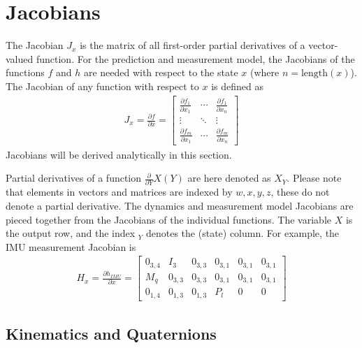 \section{Jacobians}
\label{sec:jacobians}
The Jacobian $J_x$ is the matrix of all first-order partial derivatives of a vector-valued function.
For the prediction and measurement model, the Jacobians of  the functions $f$ and $h$ are needed with respect to the state $x$ (where $n = \mathrm{length}(x)$).
The Jacobian of any function with respect to $x$ is defined as %
\begin{align}
    J_x = \frac{\partial f}{\partial x}
    = \begin{bmatrix}
        \frac{\partial f_1}{\partial x_1} & \cdots & \frac{\partial f_1}{\partial x_n} \\
        \vdots & \ddots & \vdots \\
        \frac{\partial f_m}{\partial x_1} & \cdots & \frac{\partial f_m}{\partial x_n}
    \end{bmatrix}
\end{align}
Jacobians will be derived analytically in this section.

Partial derivatives of a function $\frac{\partial}{\partial Y} X(Y)$ are here denoted as $X_Y$. 
Please note that elements in vectors and matrices are indexed by $w,x,y,z$, these do not denote a partial derivative.
The dynamics and measurement model Jacobians are pieced together from the Jacobians of the individual functions.
The variable $X$ is the output row, and the index $_Y$ denotes the (state) column.
For example, the IMU measurement Jacobian is
\begin{align}
    H_x = \frac{\partial h_{IMU}}{\partial x}
    = \begin{bmatrix}
        0_{3,4} & I_3 & 0_{3,3} & 0_{3,1} & 0_{3,1} & 0_{3,1} \\
        M_q & 0_{3,3} & 0_{3,3} & 0_{3,1} & 0_{3,1} & 0_{3,1} \\
        0_{1,4} & 0_{1,3} & 0_{1,3} & P_l & 0 & 0
    \end{bmatrix}
\end{align}

\subsection{Kinematics and Quaternions}
\label{sec:jacobians-kinematics}

